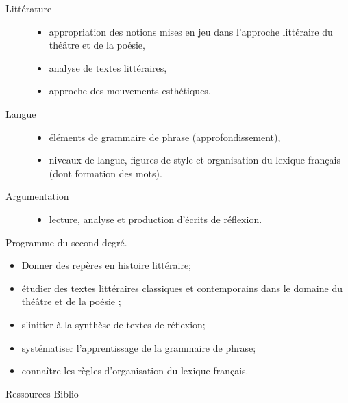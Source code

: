 \documentclass[10pt, a5paper]{report}
\begin{document}
{\begin{description}
\item[Littérature]
\begin{itemize}
\item appropriation des notions mises en jeu dans l'approche littéraire du théâtre et de la poésie,
\item analyse de textes littéraires,
\item approche des mouvements esthétiques.
\end{itemize}
\item[Langue]
\begin{itemize}
\item éléments de grammaire de phrase (approfondissement),
\item niveaux de langue, figures de style et organisation du lexique français (dont formation des mots).
\end{itemize}
\item[Argumentation]
\begin{itemize}
\item lecture, analyse et production d'écrits de réflexion.
\end{itemize}
\end{description}
}
{Programme du second degré.}
{
\begin{itemize}
\item Donner des repères en histoire littéraire; 
\item étudier des textes littéraires classiques et contemporains dans le domaine du théâtre et de la poésie ; 
\item s'initier à la synthèse de textes de réflexion;
\item systématiser l'apprentissage de la grammaire de phrase;
\item connaître les règles d'organisation du lexique français.
\end{itemize}
}
{Ressources} 
{Biblio} 
 
\end{document}
